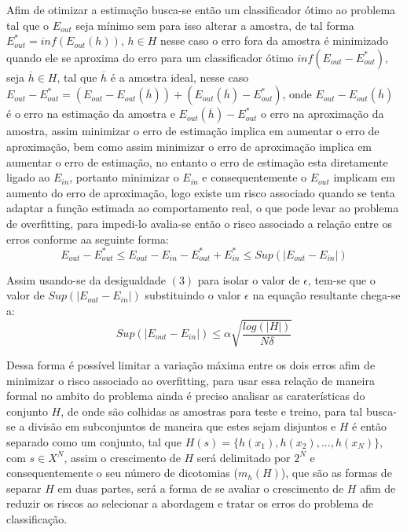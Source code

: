 \documentclass[pfc]{imetex}
\begin{document}
    Afim de otimizar a estimação busca-se então um classificador ótimo ao problema tal que o $E_{out}$ seja mínimo sem para isso alterar a amostra, de tal forma $E_{out}^{*} = inf( E_{out}(h))$, $h \in H$ nesse caso o erro fora da amostra é minimizado quando ele se aproxima do erro para um classificador ótimo $inf(E_{out}-E_{out}^{*})$, seja $\overline{h} \in H$, tal que $\overline{h}$ é a amostra ideal, nesse caso $E_{out}-E_{out}^{*} = (E_{out} - E_{out}(\overline{h})) + (E_{out}(\overline{h}) - E_{out}^{*})$, onde $E_{out} - E_{out}(\overline{h})$ é o erro na estimação da amostra e $E_{out}(\overline{h}) - E_{out}^{*}$ o erro na aproximação da amostra, assim minimizar o erro de estimação implica em aumentar o erro de aproximação, bem como assim minimizar o erro de aproximação implica em aumentar o erro de estimação, no entanto o erro de estimação esta diretamente ligado ao $E_{in}$, portanto minimizar o $E_{in}$ e consequentemente o $E_{out}$ implicam em aumento do erro de aproximação, logo existe um risco associado quando se tenta adaptar a função estimada ao comportamento real, o que pode levar ao problema de overfitting, para impedi-lo avalia-se então o risco associado a relação entre os erros conforme aa seguinte forma:
    \begin{equation}
        E_{out} - E_{out}^{*} \leq E_{out} - E_{in} - E_{out}^{*} + E_{in}^{*} \leq Sup(|E_{out}-E_{in}|)
    \end{equation}

    Assim usando-se da desigualdade $(3)$ para isolar o valor de $\epsilon$, tem-se que o valor de $Sup(|E_{out}-E_{in}|)$ substituindo o valor $\epsilon$ na equação resultante chega-se a:
    \begin{equation}
        Sup(|E_{out}-E_{in}|) \leq \alpha \sqrt{\frac{log(|H|)}{N\delta}}
    \end{equation}   

    Dessa forma é possível limitar a variação máxima entre os dois erros afim de minimizar o risco associado ao overfitting, para usar essa relação de maneira formal no ambito do problema ainda é preciso analisar as caraterísticas do conjunto $H$, de onde são colhidas as amostras para teste e treino, para tal busca-se a divisão em subconjuntos de maneira que estes sejam disjuntos e $H$ é então separado como um conjunto, tal que $H(s) = \{ h(x_1), h(x_2), ..., h(x_N) \}$, com $s \in X^N$, assim o crescimento de $H$ será delimitado por $2^N$ e consequentemente o seu número de dicotomias ($m_h(H)$), que são as formas de separar $H$ em duas partes, será a forma de se avaliar o crescimento de $H$ afim de reduzir os riscos ao selecionar a abordagem e tratar os erros do problema de classificação.
\end{document}
